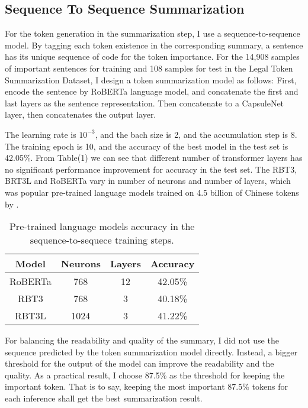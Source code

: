 \documentclass[11pt,a4paper]{article}
\begin{document}
\subsection{Sequence To Sequence Summarization}

For the token generation in the summarization step, I use a sequence-to-sequence model.
By tagging each token existence in the corresponding summary, a sentence has its unique sequence of code for the token importance.
For the 14,908 samples of important sentences for training and 108 samples for test in the Legal Token Summarization Dataset,
I design a token summarization model as follows:
First, encode the sentence by RoBERTa language model, and concatenate the first and last layers as the sentence representation.
Then concatenate to a CapsuleNet layer, then concatenates the output layer.

The learning rate is $10^{-3}$, and the bach size is 2, and the accumulation step is 8.
The training epoch is 10, and the accuracy of the best model in the test set is 42.05\%.
From Table(1) we can see that different number of transformer layers has no significant performance improvement for accuracy in the test set.
The RBT3, BRT3L and RoBERTa vary in number of neurons and number of layers,
which was popular pre-trained language models trained on 4.5 billion of Chinese tokens by \citet{cui2020revisiting}.

\begin{table}
\centering
\begin{tabular}{cccc}
\hline
\textbf{Model} & \textbf{Neurons}& \textbf{Layers} & \textbf{Accuracy} \\
\hline
RoBERTa & 768 & 12 & 42.05\% \\
RBT3 & 768 & 3 & 40.18\% \\
RBT3L & 1024 & 3 & 41.22\% \\
\hline
\end{tabular}
\caption{Pre-trained language models accuracy in the sequence-to-sequece training steps.}
\end{table}


For balancing the readability and quality of the summary, I did not use the sequence predicted by the token summarization model directly.
Instead, a bigger threshold for the output of the model can improve the readability and the quality.
As a practical result, I choose 87.5\% as the threshold for keeping the important token.
That is to say, keeping the most important 87.5\% tokens for each inference shall get the best summarization result.
\end{document}
